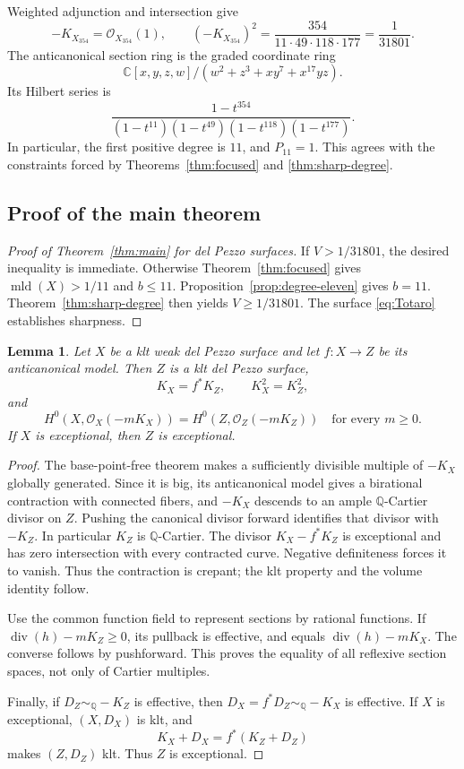 \documentclass[12pt,a4paper]{article}
\numberwithin{equation}{section}
\newtheorem{lemma}[theorem]{Lemma}
\theoremstyle{definition}
\newcommand{\Q}{\mathbb Q}
\newcommand{\C}{\mathbb C}
\newcommand{\OO}{\mathcal O}
\newcommand{\mld}{\operatorname{mld}}
\newcommand{\divi}{\operatorname{div}}
\begin{document}
Weighted adjunction and intersection give
\[
       -K_{X_{354}}=\OO_{X_{354}}(1),\qquad
       (-K_{X_{354}})^2
            =\frac{354}{11\cdot49\cdot118\cdot177}
            =\frac1{31801}.
\]
The anticanonical section ring is the graded coordinate ring
\[
 \C[x,y,z,w]/(w^2+z^3+xy^7+x^{17}yz).
\]
Its Hilbert series is
\[
                    \frac{1-t^{354}}
                    {(1-t^{11})(1-t^{49})(1-t^{118})(1-t^{177})}.
\]
In particular, the first positive degree is \(11\), and \(P_{11}=1\).
This agrees with the constraints forced by
Theorems~\ref{thm:focused} and \ref{thm:sharp-degree}.

\subsection{Proof of the main theorem}

\begin{proof}[Proof of Theorem~\ref{thm:main} for del Pezzo surfaces]
If \(V>1/31801\), the desired inequality is immediate.
Otherwise Theorem~\ref{thm:focused} gives \(\mld(X)>1/11\)
and \(b\leq11\).
Proposition~\ref{prop:degree-eleven} gives \(b=11\).
Theorem~\ref{thm:sharp-degree} then yields \(V\geq1/31801\).
The surface \eqref{eq:Totaro} establishes sharpness.
\end{proof}

\begin{lemma}\label{lem:weak-model}
Let \(X\) be a klt weak del Pezzo surface and let
\(f:X\to Z\) be its anticanonical model.
Then \(Z\) is a klt del Pezzo surface,
\[
                     K_X=f^*K_Z,\qquad K_X^2=K_Z^2,
\]
and
\[
       H^0(X,\OO_X(-mK_X))=H^0(Z,\OO_Z(-mK_Z))
                         \quad\text{for every }m\geq0.
\]
If \(X\) is exceptional, then \(Z\) is exceptional.
\end{lemma}

\begin{proof}
The base-point-free theorem makes a sufficiently divisible multiple
of \(-K_X\) globally generated.
Since it is big, its anticanonical model gives a birational
contraction with connected fibers, and \(-K_X\) descends to an ample
\(\Q\)-Cartier divisor on \(Z\).
Pushing the canonical divisor forward identifies that divisor with
\(-K_Z\). In particular \(K_Z\) is \(\Q\)-Cartier.
The divisor \(K_X-f^*K_Z\) is exceptional and has zero intersection
with every contracted curve. Negative definiteness forces it to
vanish. Thus the contraction is crepant; the klt property and the
volume identity follow.

Use the common function field to represent sections by rational
functions. If \(\divi(h)-mK_Z\geq0\), its pullback is effective,
and equals \(\divi(h)-mK_X\).
The converse follows by pushforward. This proves the equality of
all reflexive section spaces, not only of Cartier multiples.

Finally, if \(D_Z\sim_{\Q}-K_Z\) is effective, then
\(D_X=f^*D_Z\sim_{\Q}-K_X\) is effective.
If \(X\) is exceptional, \((X,D_X)\) is klt, and
\[
                         K_X+D_X=f^*(K_Z+D_Z)
\]
makes \((Z,D_Z)\) klt.
Thus \(Z\) is exceptional.
\end{proof}
\end{document}

